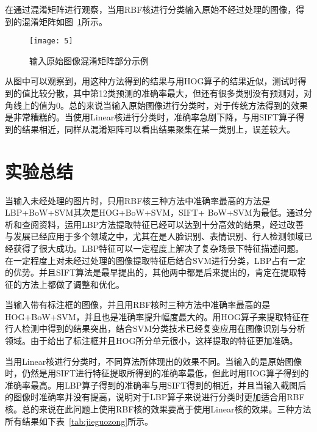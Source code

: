 在通过混淆矩阵进行观察，当用RBF核进行分类输入原始不经过处理的图像，得到的混淆矩阵如图~\ref{fig:lbprbf}所示。

\begin{figure}[H] %
  \centering
  \texttt{[image: 5]}
  \caption{输入原始图像混淆矩阵部分示例}
  \label{fig:lbprbf}
\end{figure}

从图中可以观察到，用这种方法得到的结果与用HOG算子的结果近似，测试时得到的值比较分散，其中第12类预测的准确率最大，但还有很多类别没有预测对，对角线上的值为0。总的来说当输入原始图像进行分类时，对于传统方法得到的效果是非常糟糕的。当使用Linear核进行分类时，准确率急剧下降，与用SIFT算子得到的结果相近，同样从混淆矩阵可以看出结果聚集在某一类别上，误差较大。

\section{实验总结}
\label{sec:shiyanzongjie}
当输入未经处理的图片时，只用RBF核三种方法中准确率最高的方法是LBP+BoW+SVM其次是HOG+BoW+SVM，SIFT+ BoW+SVM为最低。通过分析和查阅资料，运用LBP方法提取特征已经可以达到十分高效的结果，经过改善与发展已经应用于多个领域之中，尤其在是人脸识别、表情识别、行人检测领域已经获得了很大成功。LBP特征可以一定程度上解决了复杂场景下特征描述问题。在一定程度上对未经过处理的图像提取特征后结合SVM进行分类，LBP占有一定的优势。并且SIFT算法是最早提出的，其他两中都是后来提出的，肯定在提取特征的方法上都做了调整和优化。

当输入带有标注框的图像，并且用RBF核时三种方法中准确率最高的是HOG+BoW+SVM，并且也是准确率提升幅度最大的。用HOG算子来提取特征在行人检测中得到的结果突出，结合SVM分类技术已经复变应用在图像识别与分析领域。由于给出了标注框并且HOG所分单元很小，这样提取的特征更加准确。

当用Linear核进行分类时，不同算法所体现出的效果不同。当输入的是原始图像时，仍然是用SIFT进行特征提取所得到的准确率最低，但此时用HOG算子得到的准确率最高。用LBP算子得到的准确率与用SIFT得到的相近，并且当输入截图后的图像时准确率并没有提高，说明对于LBP算子来说进行分类时更加适合用RBF核。总的来说在此问题上使用RBF核的效果要高于使用Linear核的效果。三种方法所有结果如下表~\ref{tab:jieguozong}所示。


